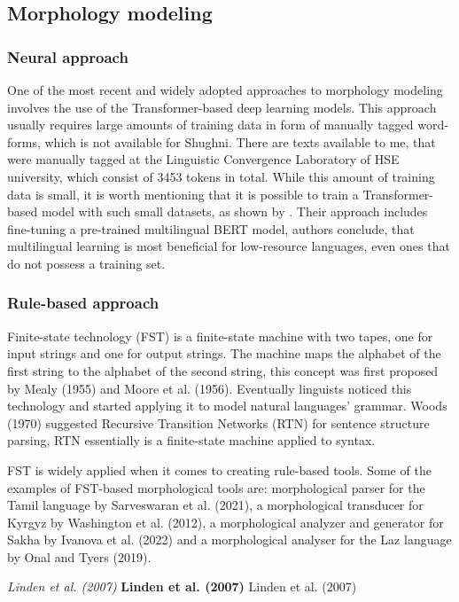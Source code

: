 \subsection{Morphology modeling}
\subsubsection{Neural approach}
\par One of the most recent and widely adopted approaches to morphology modeling involves the use of the Transformer-based deep learning models. This approach usually requires large amounts of training data in form of manually tagged word-forms, which is not available for Shughni. There are texts available to me, that were manually tagged at the Linguistic Convergence Laboratory of HSE university, which consist of 3453 tokens in total. While this amount of training data is small, it is worth mentioning that it is possible to train a Transformer-based model with such small datasets, as shown by \cite{kondratyuk_straka_model_2019}. Their approach includes fine-tuning a pre-trained multilingual BERT model, authors conclude, that multilingual learning is most beneficial for low-resource languages, even ones that do not possess a training set.
\subsubsection{Rule-based approach}
\par Finite-state technology (FST) is a finite-state machine with two tapes, one for input strings and one for output strings. The machine maps the alphabet of the first string to the alphabet of the second string, this concept was first proposed by Mealy (1955) and Moore et al. (1956). Eventually linguists noticed this technology and started applying it to model natural languages' grammar. Woods (1970) suggested Recursive Transition Networks (RTN) for sentence structure parsing, RTN essentially is a finite-state machine applied to syntax. 
\par {}
\par FST is widely applied when it comes to creating rule-based tools. Some of the examples of FST-based morphological tools are: morphological parser for the Tamil language by Sarveswaran et al. (2021), a morphological transducer for Kyrgyz by Washington et al. (2012), a morphological analyzer and generator for Sakha by Ivanova et al. (2022) and a morphological analyser for the Laz language by Onal and Tyers (2019).

\par \textit{Linden et al. (2007)} \textbf{Linden et al. (2007)} Linden et al. (2007)